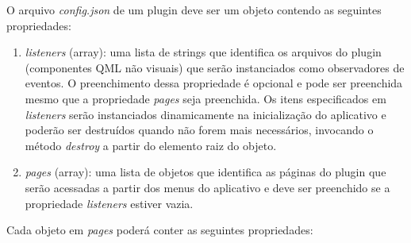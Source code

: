 O arquivo \textit{config.json} de um plugin deve ser um objeto contendo as seguintes propriedades:

\begin{enumerate}
	\item \textit{listeners} (array): uma lista de strings que identifica os arquivos do plugin (componentes QML não visuais) que serão instanciados como observadores de eventos. O preenchimento dessa propriedade é opcional e pode ser preenchida mesmo que a propriedade \textit{pages} seja preenchida. Os itens especificados em \textit{listeners} serão instanciados dinamicamente na inicialização do aplicativo e poderão ser destruídos quando não forem mais necessários, invocando o método \textit{destroy} a partir do elemento raiz do objeto.

	\item \textit{pages} (array): uma lista de objetos que identifica as páginas do plugin que serão acessadas a partir dos menus do aplicativo e deve ser preenchido se a propriedade \textit{listeners} estiver vazia.
\end{enumerate}

Cada objeto em \textit{pages} poderá conter as seguintes propriedades:

